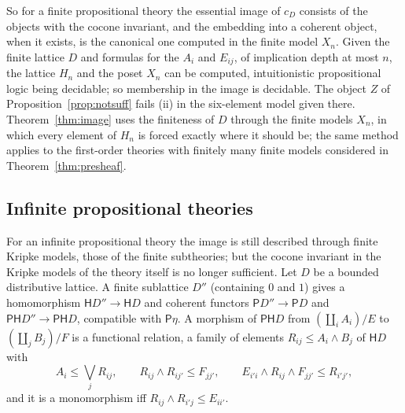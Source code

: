 \documentclass[11pt]{amsart}
\theoremstyle{definition}
\newcommand{\PP}{\mathsf P}
\newcommand{\HH}{\mathsf H}
\begin{document}
So for a finite propositional theory the essential image of $c_D$
consists of the objects with the cocone invariant, and the embedding
into a coherent object, when it exists, is the canonical one computed
in the finite model $X_n$. Given the finite lattice $D$ and formulas for the $A_i$ and
$E_{ij}$, of implication depth at most $n$, the lattice $H_n$ and the
poset $X_n$ can be computed, intuitionistic propositional logic being
decidable; so membership in the image is decidable. The object $Z$ of
Proposition~\ref{prop:notsuff} fails (ii) in the six-element model
given there. Theorem~\ref{thm:image} uses the finiteness of $D$ through
the finite models $X_n$, in which every element of $H_n$ is forced
exactly where it should be; the same method applies to the first-order
theories with finitely many finite models considered in
Theorem~\ref{thm:presheaf}.

\subsection*{Infinite propositional theories}
For an infinite propositional theory the image is still described
through finite Kripke models, those of the finite subtheories; but the
cocone invariant in the Kripke models of the theory itself is no longer
sufficient. Let $D$ be a bounded distributive lattice. A finite
sublattice $D''$ (containing $0$ and $1$) gives a homomorphism
$\HH D''\to\HH D$ and coherent functors $\PP D''\to\PP D$ and
$\PP\HH D''\to\PP\HH D$, compatible with $\PP\eta$. A morphism of
$\PP\HH D$ from $(\coprod_iA_i)/E$ to $(\coprod_jB_j)/F$ is a
functional relation, a family of elements $R_{ij}\le A_i\wedge B_j$ of
$\HH D$ with
\[
A_i\le\textstyle\bigvee_jR_{ij},\qquad R_{ij}\wedge R_{ij'}\le
F_{jj'},\qquad E_{i'i}\wedge R_{ij}\wedge F_{jj'}\le R_{i'j'},
\]
and it is a monomorphism iff $R_{ij}\wedge R_{i'j}\le E_{ii'}$.
\end{document}
